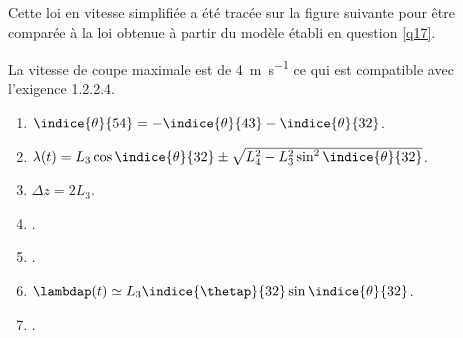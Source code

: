 \ifprof\else
Cette loi en vitesse simplifiée a été tracée sur la figure suivante pour être comparée à la loi obtenue à
partir du modèle établi en question \ref{q17}.
\fi



\ifprof
\begin{corrige}
La vitesse de coupe maximale est de \SI{4}{m.s^{-1}} ce qui est compatible avec l'exigence 1.2.2.4.
\end{corrige}
\else
\fi
\ifprof\else
\begin{solution}
\begin{enumerate}
\item $\indice{\theta}{54} = -\indice{\theta}{43} -\indice{\theta}{32}$.
\item $\lambda(t) = L_3 \cos \indice{\theta}{32} \pm\sqrt{L_4^2 -   L_3^2 \sin^2 \indice{\theta}{32}}$.
\item $\Delta z=  2L_3  $.
\item .
\item .
\item $\lambdap(t) \simeq L_3 \indice{\thetap}{32}\sin \indice{\theta}{32}  $.
\item .
\end{enumerate}
\end{solution}
\fi